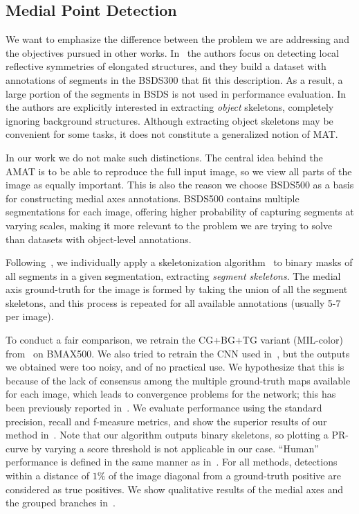 \documentclass[10pt,twocolumn,letterpaper]{article}
\begin{document}
\subsection{Medial Point Detection}\label{sec:experiments:detection}
We want to emphasize the difference between the problem we are addressing and the objectives pursued in other works.
In~\cite{tsogkas2012learning} the authors focus on detecting local reflective symmetries of elongated structures,
and they build a dataset with annotations of segments in the BSDS300 that fit this description.
As a result, a large portion of the segments in BSDS is not used in performance evaluation.
In~\cite{shen2016object} the authors are explicitly interested in extracting \emph{object}
skeletons, completely ignoring background structures.
Although extracting object skeletons may be convenient for some tasks, it does not constitute a generalized
notion of MAT.

In our work we do not make such distinctions. 
The central idea behind the AMAT is to be able to reproduce the full input image,
so we view all parts of the image as equally important.
This is also the reason we choose BSDS500 as a basis for constructing medial axes annotations.
BSDS500 contains multiple segmentations for each image, offering higher probability of
capturing segments at varying scales, making it more relevant to the problem we are trying to solve
than datasets with object-level annotations.

Following~\cite{tsogkas2012learning}, 
we individually apply a skeletonization algorithm~\cite{telea2002augmented} 
to binary masks of all segments in a given segmentation, extracting \emph{segment skeletons}.
The medial axis ground-truth for the image is formed by taking the union of all the segment skeletons, and this
process is repeated for all available annotations (usually 5-7 per image).

To conduct a fair comparison, we retrain the CG+BG+TG variant (MIL-color) from~\cite{tsogkas2012learning} on BMAX500.
We also tried to retrain the CNN used in~\cite{shen2016object}, but the outputs we obtained were too noisy, 
and of no practical use.
We hypothesize that this is because of the lack of consensus among the multiple ground-truth maps
available for each image, which leads to convergence problems for the network; this has been previously
reported in~\cite{xie2015holistically}.
We evaluate performance using the standard precision, recall and f-measure metrics, 
and show the superior results of our method in~.
Note that our algorithm outputs binary skeletons, so plotting a PR-curve
by varying a score threshold is not applicable in our case.
``Human'' performance is defined in the same manner as in~\cite{martin2004learning,tsogkas2012learning}.
For all methods, detections within a distance of $1\%$ of the image diagonal from a ground-truth positive 
are considered as true positives.
We show qualitative results of the medial axes and the grouped branches in~.
\end{document}
